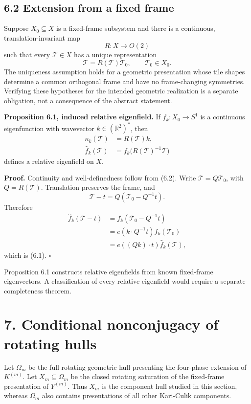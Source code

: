 \documentclass[11pt]{article}
\begin{document}
\subsection*{6.2 Extension from a fixed frame}

Suppose \(X_0\subseteq X\) is a fixed-frame subsystem and there is a
continuous, translation-invariant map
\[
  R:X\longrightarrow O(2)
\]
such that every \(\mathcal T\in X\) has a unique representation
\[
  \mathcal T=R(\mathcal T)\mathcal T_0,
  \qquad \mathcal T_0\in X_0.
  \tag{6.2}
\]
The uniqueness assumption holds for a geometric presentation whose tile
shapes determine a common orthogonal frame and have no frame-changing
symmetries. Verifying these hypotheses for the intended geometric
realization is a separate obligation, not a consequence of the abstract
statement.

\textbf{Proposition 6.1, induced relative eigenfield.} If
\(f_k:X_0\to S^1\) is a continuous eigenfunction with wavevector
\(k\in(\mathbb R^2)^*\), then
\[
\begin{aligned}
  \kappa_k(\mathcal T)&=R(\mathcal T)k,\\
  \widehat f_k(\mathcal T)&=
    f_k\bigl(R(\mathcal T)^{-1}\mathcal T\bigr)
\end{aligned}
\tag{6.3}
\]
defines a relative eigenfield on \(X\).

\textbf{Proof.} Continuity and well-definedness follow from (6.2). Write
\(\mathcal T=Q\mathcal T_0\), with \(Q=R(\mathcal T)\). Translation
preserves the frame, and
\[
  \mathcal T-t=Q(\mathcal T_0-Q^{-1}t).
\]
Therefore
\[
\begin{aligned}
\widehat f_k(\mathcal T-t)
 &=f_k(\mathcal T_0-Q^{-1}t)\\
 &=e(k\mathbin{\cdot}Q^{-1}t)f_k(\mathcal T_0)\\
 &=e((Qk)\mathbin{\cdot}t)\widehat f_k(\mathcal T),
\end{aligned}
\]
which is (6.1). \(\square\)

Proposition 6.1 constructs relative eigenfields from known fixed-frame
eigenvectors. A classification of every relative eigenfield would require a
separate completeness theorem.

\section*{7. Conditional nonconjugacy of rotating hulls}

Let \(\Omega_m\) be the full rotating geometric hull presenting the
four-phase extension of \(K^{(m)}\). Let \(X_m\subseteq\Omega_m\) be the
closed rotating saturation of the fixed-frame presentation of
\(Y^{(m)}\). Thus \(X_m\) is the component hull studied in this section,
whereas \(\Omega_m\) also contains presentations of all other Kari-Culik
components.
\end{document}
